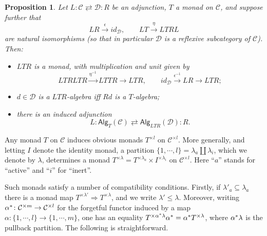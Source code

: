 \documentclass[a4paper,10pt
,draft
]{article}%
\numberwithin{equation}{section}
\numberwithin{figure}{section}
\newtheorem{proposition}[equation]{Proposition}%
\theoremstyle{definition} %
\newcommand{\C}{\ensuremath{\mathcal C}}
\newcommand{\1}{\ensuremath{\mathbbm 1}}%
\begin{document}
\begin{proposition}\label{MONADADJ PROP}
Let
$
L \colon \mathcal{C} \rightleftarrows \mathcal{D} \colon R
$
be an adjunction, $T$ a monad on $\mathcal{C}$, and suppose further that
\[
	LR \xrightarrow{\epsilon} id_{\mathcal{D}}, 
\qquad
	LT \xrightarrow{\eta} LTRL
\]
are natural isomorphisms 
(so that in particular $\mathcal{D}$ is a reflexive subcategory of $\mathcal{C}$).
Then:
\begin{itemize}
\item[(i)] $LTR$ is a monad, with multiplication and unit given by
\[LTRLTR \xrightarrow{\eta^{-1}} LTTR \to LTR,\qquad
id_{\mathcal{D}} \xrightarrow{\epsilon^{-1}} LR \to LTR;
\]
\item[(ii)]
$d \in \mathcal{D}$ is a $LTR$-algebra iff $Rd$ is a $T$-algebra;
\item[(iii)] there is an induced adjunction
\[
L \colon \mathsf{Alg}_{T}(\mathcal{C})
	\rightleftarrows
\mathsf{Alg}_{LTR}(\mathcal{D}) \colon R.
\]
\end{itemize}
\end{proposition}



Any monad $T$ on $\C$ induces obvious monads $T^{\times l}$ on $\C^{\times l}$.
More generally, and 
letting $I$ denote the identity monad,
a partition 
$\{1,\cdots,l\} = \lambda_a \amalg \lambda_i$,
which we denote by $\lambda$,
determines a monad 
$T^{\times \lambda} = T^{\times \lambda_a} \times I^{\times \lambda_i}$ on $\mathcal{C}^{\times l}$.
Here ``$a$'' stands for ``active'' and ``$i$'' for ``inert''.

Such monads satisfy a number of compatibility conditions. 
Firstly, if $\lambda'_a \subseteq \lambda_a$
there is a monad map
$T^{\times \lambda'} \Rightarrow T^{\times \lambda}$,
and we write $\lambda' \leq \lambda$.
Moreover, writing $\alpha^{\**} \colon 
\C^{\times m} \to \C^{\times l}$
for the forgetful functor induced by
a map $\alpha \colon \{1,\cdots,l\} \to \{1,\cdots,m\}$,
one has an equality
$T^{\times \alpha^{\**}\lambda} \alpha^{\**} =
\alpha^{\**} T^{\times \lambda}$,
where $\alpha^{\**}\lambda$ is the pullback partition.
The following is straightforward.
\end{document}
